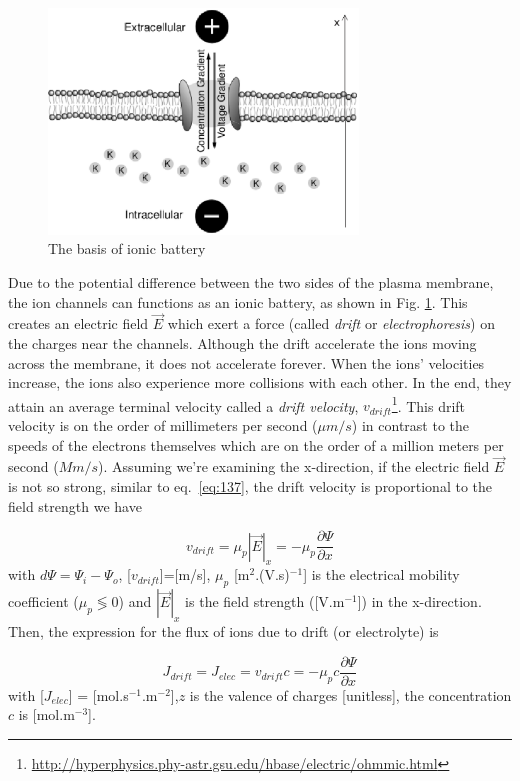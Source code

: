 \begin{figure}[htb]
  \centerline{\includegraphics[height=6cm]{./images/membrane_battery.eps}}
  \caption{The basis of ionic battery}\label{fig:membrane-battery}
\end{figure}

Due to the potential difference between the two sides of the plasma
membrane, the ion channels can functions as an ionic battery, as shown
in Fig. \ref{fig:membrane-battery}. This creates an electric field
$\vec{E}$ which exert a force (called {\it drift} or
{\it electrophoresis}) on the charges near the channels. Although the
drift accelerate the ions moving across the membrane, it does not
accelerate forever. When the ions' velocities increase, the ions also
experience more collisions with each other. In the end, they attain an
average terminal velocity called a {\it drift velocity},
$v_{drift}$\footnote{\url{http://hyperphysics.phy-astr.gsu.edu/hbase/electric/ohmmic.html}}. This
drift velocity is on the order of millimeters per second ($\mu m/s$)
in contrast to the speeds of the electrons themselves which are on the
order of a million meters per second ($Mm/s$).  Assuming we're
examining the x-direction, if the electric field $\vec{E}$ is not so
strong, similar to eq.~\eqref{eq:137}, the drift velocity is
proportional to the field strength we have

\begin{equation}
  v_{drift} = \mu_p |\vec{E}|_x = -\mu_p \frac{\partial \Psi}{\partial x}
\end{equation}
with $d\Psi=\Psi_i-\Psi_o$, [$v_{drift}$]=[m/s], $\mu_p$
[m$^2$.(V.s)$^{-1}$] is the electrical mobility coefficient ($\mu_p
\lessgtr 0$) and $|\vec{E}|_x$ is the field strength ([V.m$^{-1}$]) in
the x-direction.  Then, the expression for the flux of ions due to
drift (or electrolyte) is

\begin{equation}\label{eq:J_elec}
  J_{drift} = J_{elec} = v_{drift} c = -\mu_p c \frac{\partial \Psi}{\partial x}
\end{equation}
with [$J_{elec}$] = [mol.s$^{-1}$.m$^{-2}$],$z$ is the valence of
charges [unitless], the concentration $c$ is [mol.m$^{-3}$].

